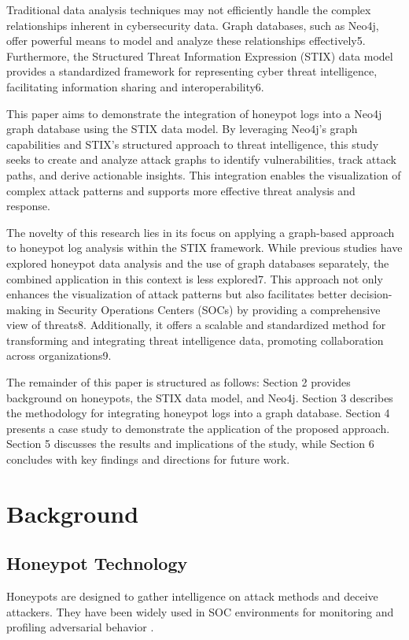\documentclass[conference]{IEEEtran}
\begin{document}
Traditional data analysis techniques may not efficiently handle the complex relationships inherent in cybersecurity data. Graph databases, such as Neo4j, offer powerful means to model and analyze these relationships effectively5. Furthermore, the Structured Threat Information Expression (STIX) data model provides a standardized framework for representing cyber threat intelligence, facilitating information sharing and interoperability6.

This paper aims to demonstrate the integration of honeypot logs into a Neo4j graph database using the STIX data model. By leveraging Neo4j's graph capabilities and STIX's structured approach to threat intelligence, this study seeks to create and analyze attack graphs to identify vulnerabilities, track attack paths, and derive actionable insights. This integration enables the visualization of complex attack patterns and supports more effective threat analysis and response.

The novelty of this research lies in its focus on applying a graph-based approach to honeypot log analysis within the STIX framework. While previous studies have explored honeypot data analysis and the use of graph databases separately, the combined application in this context is less explored7. This approach not only enhances the visualization of attack patterns but also facilitates better decision-making in Security Operations Centers (SOCs) by providing a comprehensive view of threats8. Additionally, it offers a scalable and standardized method for transforming and integrating threat intelligence data, promoting collaboration across organizations9.

The remainder of this paper is structured as follows: Section 2 provides background on honeypots, the STIX data model, and Neo4j. Section 3 describes the methodology for integrating honeypot logs into a graph database. Section 4 presents a case study to demonstrate the application of the proposed approach. Section 5 discusses the results and implications of the study, while Section 6 concludes with key findings and directions for future work.



\section{Background}
\subsection{Honeypot Technology}
Honeypots are designed to gather intelligence on attack methods and deceive attackers. They have been widely used in SOC environments for monitoring and profiling adversarial behavior \cite{honeypotsurvey}.
\end{document}
